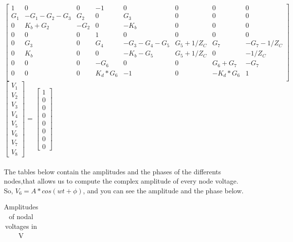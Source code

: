 $\begin{bmatrix}
1 & 0 & 0 & -1 & 0 & 0 & 0 & 0 \\
G_1 & -G_1-G_2-G_3 & G_2 & 0 & G_3 & 0 & 0 & 0\\
0 & K_b+G_2 & -G_2 & 0 & -K_b & 0 & 0 & 0\\
0 & 0 & 0 & 1 & 0 & 0 & 0 & 0\\
0 & G_3 & 0 & G_4 & -G_3-G_4-G_5 & G_5+1/Z_C & G_7 & -G_7-1/Z_C\\
0 & K_b & 0 & 0 & -K_b-G_5 & G_5+1/Z_C & 0 & -1/Z_C\\
0 & 0 & 0 & -G_6 & 0 & 0 & G_6+G_7 & -G_7\\
0 & 0 & 0 & K_d*G_6 & -1 & 0 & -K_d*G_6 & 1\\
\end{bmatrix}$
$\begin{bmatrix}
V_1 \\ V_2 \\ V_3 \\ V_4 \\ V_5 \\ V_6 \\ V_7 \\ V_8
\end{bmatrix}$
= 
$\begin{bmatrix}
1 \\ 0 \\ 0 \\ 0 \\ 0 \\ 0 \\ 0 \\ 0
\end{bmatrix}$

\paragraph{}
\par The tables below contain the amplitudes and the phases of the differents nodes,that allows us to compute the complex amplitude of every node voltage. So, $V_{6} = A*cos(wt + \phi)$, and you can see the amplitude and the phase below.

\begin{table}[h]
\centering
\begin{tabularx}{0.6\textwidth} {
  | >{\raggedright\arraybackslash}X
  | >{\raggedleft\arraybackslash}X | }
 \hline

\end{tabularx}
\caption{Amplitudes of nodal voltages in V}
\end{table}

